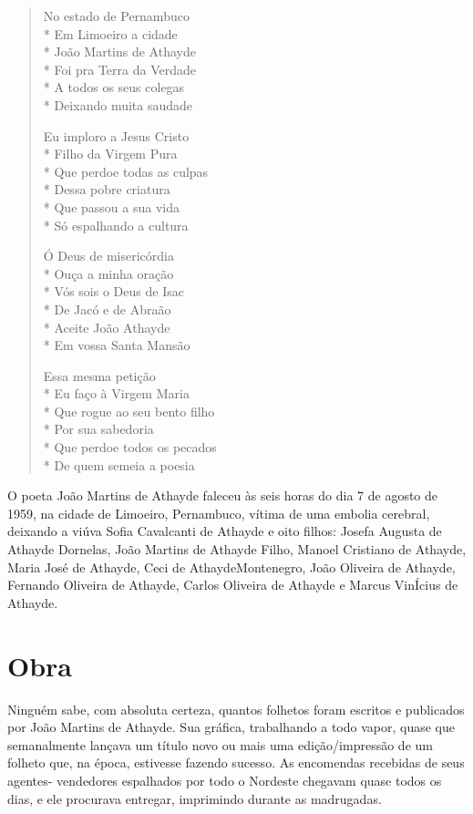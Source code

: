 \begin{verse}
No estado de Pernambuco\\*
Em Limoeiro a cidade\\*
João Martins de Athayde\\*
Foi pra Terra da Verdade\\*
A todos os seus colegas\\*
Deixando muita saudade

Eu imploro a Jesus Cristo\\*
Filho da Virgem Pura\\*
Que perdoe todas as culpas\\*
Dessa pobre criatura\\*
Que passou a sua vida\\*
Só espalhando a cultura

Ó Deus de misericórdia\\*
Ouça a minha oração\\*
Vós sois o Deus de Isac\\*
De Jacó e de Abraão\\*
Aceite João Athayde\\*
Em vossa Santa Mansão

Essa mesma petição\\*
Eu faço à Virgem Maria\\*
Que rogue ao seu bento filho\\*
Por sua sabedoria\\*
Que perdoe todos os pecados\\*
De quem semeia a poesia

\end{verse}

O poeta João Martins de Athayde faleceu às seis horas
do dia 7 de agosto de 1959, na cidade de Limoeiro,
Pernambuco, vítima de uma embolia cerebral, deixando
a viúva Sofia Cavalcanti de Athayde e oito filhos: Josefa
Augusta de Athayde Dornelas, João Martins de Athayde
Filho, Manoel Cristiano de Athayde, Maria José de
Athayde, Ceci de AthaydeMontenegro, João Oliveira de
Athayde, Fernando Oliveira de Athayde, Carlos Oliveira
de Athayde e Marcus VinÍcius de Athayde.

\section{Obra}

Ninguém sabe, com absoluta certeza, quantos folhetos
foram escritos e publicados por João Martins de Athayde.
Sua gráfica, trabalhando a todo vapor, quase que
semanalmente lançava um título novo ou mais uma
edição/impressão de um folheto que, na época, estivesse
fazendo sucesso. As encomendas recebidas de seus agentes-
vendedores espalhados por todo o Nordeste chegavam
quase todos os dias, e ele procurava entregar, imprimindo
durante as madrugadas.

